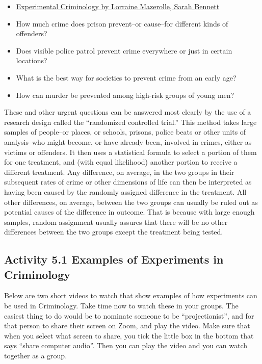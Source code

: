 \documentclass[
]{book}
\begin{document}
\begin{itemize}
\item
  \href{http://www.oxfordbibliographies.com/view/document/obo-9780195396607/obo-9780195396607-0085.xml}{Experimental Criminology by Lorraine Mazerolle, Sarah Bennett}
\item
  How much crime does prison prevent--or cause--for different kinds of offenders?
\item
  Does visible police patrol prevent crime everywhere or just in certain locations?
\item
  What is the best way for societies to prevent crime from an early age?
\item
  How can murder be prevented among high-risk groups of young men?
\end{itemize}

These and other urgent questions can be answered most clearly by the use of a research design called the ``randomized controlled trial.'' This method takes large samples of people--or places, or schools, prisons, police beats or other units of analysis--who might become, or have already been, involved in crimes, either as victims or offenders. It then uses a statistical formula to select a portion of them for one treatment, and (with equal likelihood) another portion to receive a different treatment. Any difference, on average, in the two groups in their subsequent rates of crime or other dimensions of life can then be interpreted as having been caused by the randomly assigned difference in the treatment. All other differences, on average, between the two groups can usually be ruled out as potential causes of the difference in outcome. That is because with large enough samples, random assignment usually assures that there will be no other differences between the two groups except the treatment being tested.

\hypertarget{activity-5.1-examples-of-experiments-in-criminology}{%
\subsection{Activity 5.1 Examples of Experiments in Criminology}\label{activity-5.1-examples-of-experiments-in-criminology}}

Below are two short videos to watch that show examples of how experiments can be used in Criminology. Take time now to watch these in your groups. The easiest thing to do would be to nominate someone to be ``projectionist'', and for that person to share their screen on Zoom, and play the video. Make sure that when you select what screen to share, you tick the little box in the bottom that says ``share computer audio''. Then you can play the video and you can watch together as a group.
\end{document}
